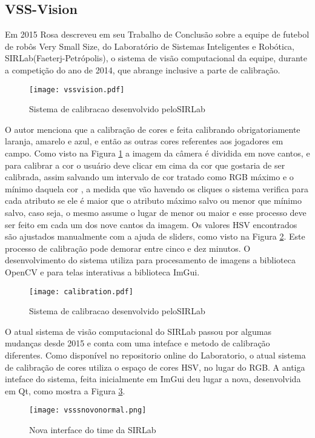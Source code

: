 \subsection{VSS-Vision}

Em 2015 Rosa\cite{Rosa:2015} descreveu em seu Trabalho de Conclusão sobre a equipe de futebol de rob\^os Very Small Size, do Laboratório de Sistemas Inteligentes e Robótica, SIRLab(Faeterj-Petrópolis), o sistema de visão computacional da equipe, durante a competição do ano de 2014, que abrange inclusive a parte de calibração. 

\begin{figure}[!h]
	\centering
	\texttt{[image: vssvision.pdf]} 	
	\caption{Sistema de calibracao desenvolvido peloSIRLab \cite{Rosa:2015}}
	\label{SIRLabCalibracao}
\end{figure}
O autor menciona que a calibração de cores e feita calibrando obrigatoriamente laranja, amarelo e azul, e então as outras cores referentes aos jogadores em campo. Como visto na Figura \ref{SIRLabCalibracao} a imagem da c\^amera é dividida em nove cantos, e para calibrar a cor o usuário deve clicar em cima da cor que gostaria de ser calibrada, assim salvando um intervalo de cor tratado como RGB máximo e o mínimo daquela cor , a medida
que vão havendo os cliques o sistema verifica para cada atributo se ele é maior que o atributo
máximo salvo ou menor que mínimo salvo, caso seja, o mesmo assume o lugar de menor ou
maior\cite{Rosa:2015} e esse processo deve ser feito em cada um dos nove cantos da imagem. Os valores HSV encontrados s\~ao ajustados manualmente com a ajuda de sliders, como visto na Figura \ref{SIRLabCalibracaoHSV}. Este processo de calibração pode demorar entre cinco e dez minutos.
O desenvolvimento do sistema utiliza para procesamento de imagens a biblioteca OpenCV e para telas interativas a biblioteca  ImGui.

\begin{figure}[!h]
	\centering
	\texttt{[image: calibration.pdf]} 	
	\caption{Sistema de calibracao desenvolvido peloSIRLab \cite{VSSVision}}
	\label{SIRLabCalibracaoHSV}
\end{figure}

O atual sistema de visão computacional do SIRLab passou por algumas mudanças desde 2015 e conta com uma inteface e metodo de calibração diferentes\cite{VSSVision}. 
Como disponível no repositorio online do Laboratorio, o atual sistema de calibração de cores utiliza o espaço de cores HSV, no lugar do RGB\cite{Rosa:2015}. A antiga inteface do sistema, feita inicialmente em ImGui deu lugar a nova, desenvolvida em Qt, como mostra a Figura \ref{SIRLabNova}.
\begin{figure}[!h]
	\centering
	\texttt{[image: vsssnovonormal.png]} 	
	\caption{Nova interface do time da SIRLab \cite{VSSVision}}
	\label{SIRLabNova}
\end{figure}


